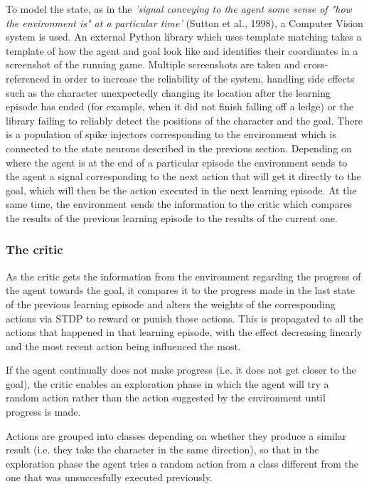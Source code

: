 \documentclass[10pt]{article}
\begin{document}
    To model the state, as in the \textit{'signal conveying to the agent some sense of "how the environment is" at a particular time'} (Sutton et al., 1998), a Computer Vision system is used. An external Python library which uses template matching takes a template of how the agent and goal look like and identifies their coordinates in a screenshot of the running game. Multiple screenshots are taken and cross-referenced in order to increase the reliability of the system, handling side effects such as the character unexpectedly changing its location after the learning episode has ended (for example, when it did not finish falling off a ledge) or the library failing to reliably detect the positions of the character and the goal. There is a population of spike injectors corresponding to the environment which is connected to the state neurons described in the previous section. Depending on where the agent is at the end of a particular episode the environment sends to the agent a signal corresponding to the next action that will get it directly to the goal, which will then be the action executed in the next learning episode. At the same time, the environment sends the information to the critic which compares the results of the previous learning episode to the results of the current one.

    \subsubsection{The critic}

    As the critic gets the information from the environment regarding the progress of the agent towards the goal, it compares it to the progress made in the last state of the previous learning episode and alters the weights of the corresponding actions via STDP to reward or punish those actions. This is propagated to all the actions that happened in that learning episode, with the effect decreasing linearly and the most recent action being influenced the most.

    If the agent continually does not make progress (i.e. it does not get closer to the goal), the critic enables an exploration phase in which the agent will try a random action rather than the action suggested by the environment until progress is made.

    Actions are grouped into classes depending on whether they produce a similar result (i.e. they take the character in the same direction), so that in the exploration phase the agent tries a random action from a class different from the one that was unsuccesfully executed previously.
\end{document}
